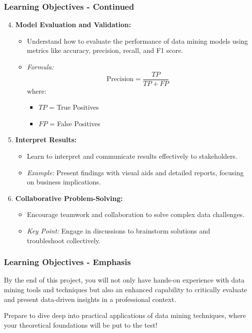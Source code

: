 \documentclass{beamer}
\begin{document}
\begin{frame}[fragile]
    \frametitle{Learning Objectives - Continued}
    \begin{enumerate}
        \setcounter{enumi}{3} %
        \item \textbf{Model Evaluation and Validation:}
        \begin{itemize}
            \item Understand how to evaluate the performance of data mining models using metrics like accuracy, precision, recall, and F1 score.
            \item \textit{Formula:} 
            \begin{equation}
                \text{Precision} = \frac{TP}{TP + FP}
            \end{equation}
            where:
            \begin{itemize}
                \item $TP$ = True Positives
                \item $FP$ = False Positives
            \end{itemize}
        \end{itemize}

        \item \textbf{Interpret Results:}
        \begin{itemize}
            \item Learn to interpret and communicate results effectively to stakeholders.
            \item \textit{Example:} Present findings with visual aids and detailed reports, focusing on business implications.
        \end{itemize}

        \item \textbf{Collaborative Problem-Solving:}
        \begin{itemize}
            \item Encourage teamwork and collaboration to solve complex data challenges.
            \item \textit{Key Point:} Engage in discussions to brainstorm solutions and troubleshoot collectively.
        \end{itemize}
    \end{enumerate}
\end{frame}

\begin{frame}[fragile]
    \frametitle{Learning Objectives - Emphasis}
    By the end of this project, you will not only have hands-on experience with data mining tools and techniques 
    but also an enhanced capability to critically evaluate and present data-driven insights in a professional context.

    Prepare to dive deep into practical applications of data mining techniques, 
    where your theoretical foundations will be put to the test!
\end{frame}
\end{document}
